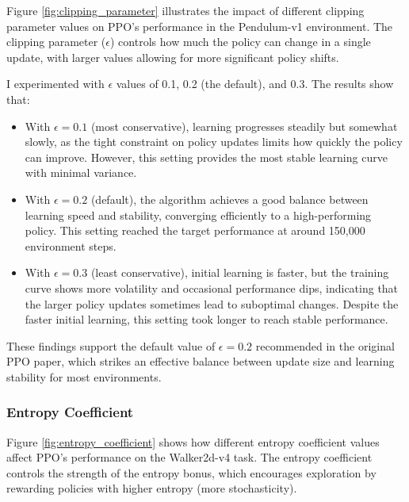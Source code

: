 \documentclass[a4paper,twocolumn]{article}
\begin{document}
Figure \ref{fig:clipping_parameter} illustrates the impact of different clipping parameter values on PPO's performance in the Pendulum-v1 environment. The clipping parameter ($\epsilon$) controls how much the policy can change in a single update, with larger values allowing for more significant policy shifts.

I experimented with $\epsilon$ values of 0.1, 0.2 (the default), and 0.3. The results show that:

\begin{itemize}
    \item With $\epsilon = 0.1$ (most conservative), learning progresses steadily but somewhat slowly, as the tight constraint on policy updates limits how quickly the policy can improve. However, this setting provides the most stable learning curve with minimal variance.
    
    \item With $\epsilon = 0.2$ (default), the algorithm achieves a good balance between learning speed and stability, converging efficiently to a high-performing policy. This setting reached the target performance at around 150,000 environment steps.
    
    \item With $\epsilon = 0.3$ (least conservative), initial learning is faster, but the training curve shows more volatility and occasional performance dips, indicating that the larger policy updates sometimes lead to suboptimal changes. Despite the faster initial learning, this setting took longer to reach stable performance.
\end{itemize}

These findings support the default value of $\epsilon = 0.2$ recommended in the original PPO paper, which strikes an effective balance between update size and learning stability for most environments.

\subsubsection{Entropy Coefficient}


Figure \ref{fig:entropy_coefficient} shows how different entropy coefficient values affect PPO's performance on the Walker2d-v4 task. The entropy coefficient controls the strength of the entropy bonus, which encourages exploration by rewarding policies with higher entropy (more stochasticity).
\end{document}
